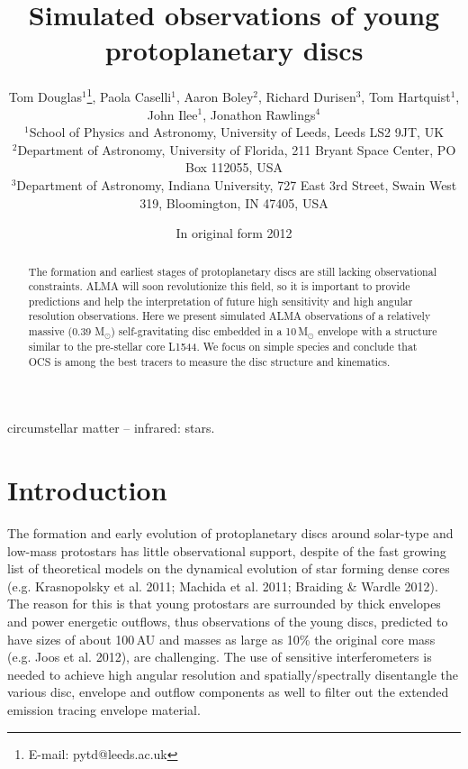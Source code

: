\documentclass[useAMS,usenatbib]{mn2e}
\title[Young protoplanetary discs]{Simulated observations of young protoplanetary discs}
\author[Tom Douglas, Paola Caselli, Et al.]{Tom Douglas$^{1}$\thanks{E-mail:
pytd@leeds.ac.uk}, Paola Caselli$^{1}$, Aaron Boley$^{2}$, Richard Durisen$^{3}$, Tom Hartquist$^{1}$, John Ilee$^{1}$, Jonathon Rawlings$^{4}$ \\
$^{1}$School of Physics and Astronomy, University of Leeds, Leeds LS2 9JT, UK \\
$^{2}$Department of Astronomy, University of Florida, 211 Bryant Space Center, PO Box 112055, USA\\
$^{3}$Department of Astronomy, Indiana University, 727 East 3rd Street, Swain West 319, Bloomington, IN 47405, USA\\
}
\begin{document}
\date{In original form 2012}

\pagerange{\pageref{firstpage}--\pageref{lastpage}} 

\maketitle

\label{firstpage}

\begin{abstract}
The formation and earliest stages of protoplanetary discs are still lacking observational constraints. ALMA will soon revolutionize this field, so it is important to provide predictions and help the interpretation of future high sensitivity and high angular resolution observations. Here we present simulated ALMA observations of a relatively massive (0.39 M$_{\odot}$) self-gravitating disc embedded in a 10\,M$_{\odot}$ envelope with a structure similar to the pre-stellar core L1544. We focus on simple species and conclude that OCS is among the best tracers to measure the disc structure and kinematics. 
\end{abstract}

\begin{keywords}
circumstellar matter -- infrared: stars.
\end{keywords}

\section{Introduction}

The formation and early evolution of protoplanetary discs around solar-type and low-mass protostars has little observational support, despite of the fast growing list of theoretical models on the dynamical evolution of star forming dense cores (e.g. Krasnopolsky et al. 2011; Machida et al. 2011; Braiding \& Wardle 2012). The reason for this is that young protostars are surrounded by thick envelopes and power energetic outflows, thus observations of the young discs, predicted to have sizes of about 100\,AU and masses as large as 10\% the original core mass (e.g. Joos et al. 2012), are challenging. The use of sensitive interferometers is needed to achieve high angular resolution and spatially/spectrally disentangle the various disc, envelope and outflow components as well to filter out the extended emission tracing envelope material. 
\end{document}
